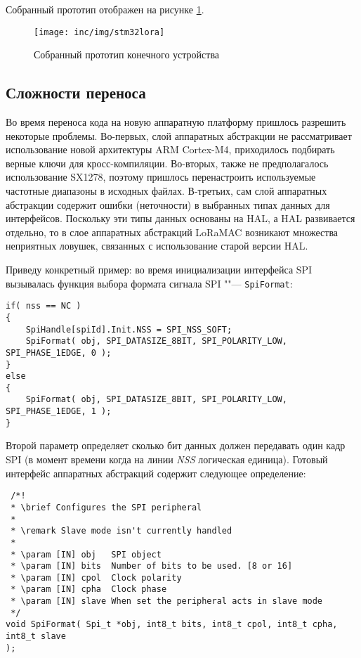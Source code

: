 Собранный прототип отображен на рисунке \ref{fig:stm32lora}.

\begin{figure}[!h]
  \centering
  \texttt{[image: inc/img/stm32lora]}
  \caption{Собранный прототип конечного устройства}
  \label{fig:stm32lora}
\end{figure}

\subsection{Сложности переноса}

Во время переноса кода на новую аппаратную платформу пришлось разрешить 
некоторые проблемы.
Во-первых, слой аппаратных абстракции не рассматривает использование новой
архитектуры ARM Cortex-M4, приходилось подбирать верные ключи для 
кросс-компиляции. 
Во-вторых, также не предполагалось использование SX1278, поэтому пришлось 
перенастроить используемые частотные диапазоны в исходных файлах.
В-третьих, сам слой аппаратных абстракции содержит ошибки (неточности) в 
выбранных типах данных для интерфейсов.
Поскольку эти типы данных основаны на HAL, а HAL развивается отдельно, то в 
слое аппаратных абстракций LoRaMAC возникают множества неприятных ловушек, 
связанных с использование старой версии HAL.

Приведу конкретный пример: во время инициализации интерфейса SPI вызывалась 
функция выбора формата сигнала SPI ""--- \texttt{SpiFormat}:

\begin{verbatim}
if( nss == NC )
{
    SpiHandle[spiId].Init.NSS = SPI_NSS_SOFT;
    SpiFormat( obj, SPI_DATASIZE_8BIT, SPI_POLARITY_LOW, SPI_PHASE_1EDGE, 0 );
}
else
{
    SpiFormat( obj, SPI_DATASIZE_8BIT, SPI_POLARITY_LOW, SPI_PHASE_1EDGE, 1 );
}
\end{verbatim}

Второй параметр определяет сколько бит данных должен передавать один кадр SPI 
(в момент времени когда на линии \textit{NSS} логическая единица).
Готовый интерфейс аппаратных абстракций содержит следующее определение:
\begin{verbatim}
 /*!
 * \brief Configures the SPI peripheral
 *
 * \remark Slave mode isn't currently handled
 *
 * \param [IN] obj   SPI object
 * \param [IN] bits  Number of bits to be used. [8 or 16]
 * \param [IN] cpol  Clock polarity
 * \param [IN] cpha  Clock phase
 * \param [IN] slave When set the peripheral acts in slave mode
 */
void SpiFormat( Spi_t *obj, int8_t bits, int8_t cpol, int8_t cpha, int8_t slave 
);
\end{verbatim}

